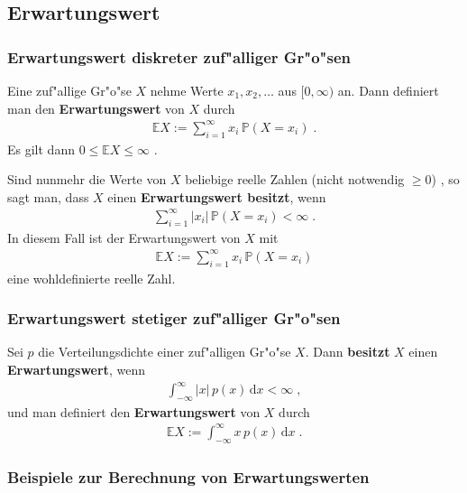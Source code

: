 \documentclass[ngerman,draft,parskip=half,twoside]{scrartcl}
\newcommand*{\E}{\mathbb{E}}        %
\newcommand*{\WKM}{\mathbb{P}}      %
\begin{document}
\subsection{Erwartungswert}
\subsubsection{Erwartungswert diskreter zuf"alliger Gr"o"sen}
Eine zuf"allige Gr"o"se $X$ nehme Werte $x_1,x_2,\ldots$ aus $[0,\infty)$ an. Dann
definiert man den \textbf{Erwartungswert} von $X$ durch
\begin{gather*}
  \E X :=\sum_{i=1}^\infty x_i\,\WKM(X=x_i)\;.
\end{gather*}
Es gilt dann $0\le \E X \le \infty$ .

Sind nunmehr die Werte von $X$ beliebige reelle Zahlen (nicht notwendig $\ge 0$)
, so sagt man, dass $X$ einen \textbf{Erwartungswert
besitzt}, wenn
\begin{gather*}
  \sum_{i=1}^\infty |x_i|\,\WKM(X=x_i)<\infty\;.
\end{gather*}
In diesem Fall ist der Erwartungswert von $X$ mit
\begin{gather*}
  \E X :=\sum_{i=1}^\infty x_i\,\WKM(X=x_i)
\end{gather*}
eine wohldefinierte reelle Zahl.

\subsubsection{Erwartungswert stetiger zuf"alliger Gr"o"sen}
Sei $p$ die Verteilungsdichte einer zuf"alligen Gr"o"se $X$. Dann \textbf{besitzt} $X$ einen
\textbf{Erwartungswert}, wenn
\begin{gather*}
  \int_{-\infty}^\infty |x|\,p(x)\,\mathrm   d x <\infty\;,
\end{gather*}
und man definiert den \textbf{Erwartungswert} von $X$ durch
\begin{gather*}
  \E X := \int_{-\infty}^\infty x \,p(x)\,\mathrm   d x\;.
\end{gather*}
\subsubsection{Beispiele zur Berechnung von Erwartungswerten}
\medskip
\end{document}
